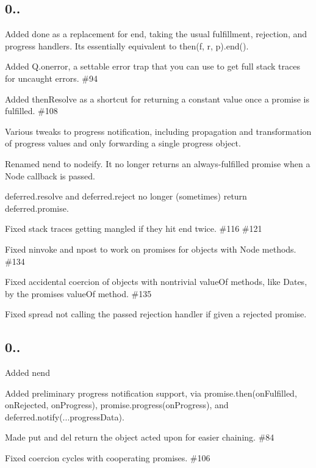 \subsection*{0..}


\begin{DoxyItemize}
\item Added {\ttfamily done} as a replacement for {\ttfamily end}, taking the usual fulfillment, rejection, and progress handlers. It\textquotesingle{}s essentially equivalent to {\ttfamily then(f, r, p).end()}.
\item Added {\ttfamily Q.\+onerror}, a settable error trap that you can use to get full stack traces for uncaught errors. \#94
\item Added {\ttfamily then\+Resolve} as a shortcut for returning a constant value once a promise is fulfilled. \#108 
\item Various tweaks to progress notification, including propagation and transformation of progress values and only forwarding a single progress object.
\item Renamed {\ttfamily nend} to {\ttfamily nodeify}. It no longer returns an always-\/fulfilled promise when a Node callback is passed.
\item {\ttfamily deferred.\+resolve} and {\ttfamily deferred.\+reject} no longer (sometimes) return {\ttfamily deferred.\+promise}.
\item Fixed stack traces getting mangled if they hit {\ttfamily end} twice. \#116 \#121 
\item Fixed {\ttfamily ninvoke} and {\ttfamily npost} to work on promises for objects with Node methods. \#134
\item Fixed accidental coercion of objects with nontrivial {\ttfamily value\+Of} methods, like {\ttfamily Date}s, by the promise\textquotesingle{}s {\ttfamily value\+Of} method. \#135
\item Fixed {\ttfamily spread} not calling the passed rejection handler if given a rejected promise.
\end{DoxyItemize}

\subsection*{0..}


\begin{DoxyItemize}
\item Added {\ttfamily nend}
\item Added preliminary progress notification support, via {\ttfamily promise.\+then(on\+Fulfilled, on\+Rejected, on\+Progress)}, {\ttfamily promise.\+progress(on\+Progress)}, and {\ttfamily deferred.\+notify(...progress\+Data)}.
\item Made {\ttfamily put} and {\ttfamily del} return the object acted upon for easier chaining. \#84
\item Fixed coercion cycles with cooperating promises. \#106
\end{DoxyItemize}

